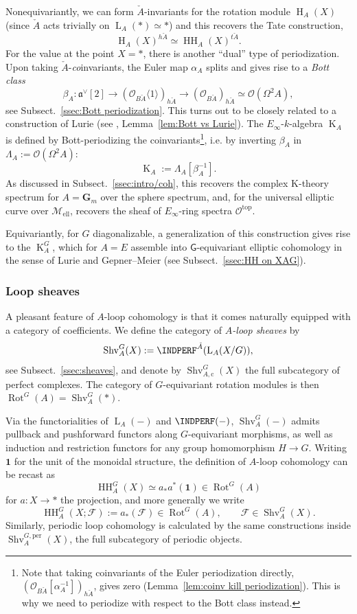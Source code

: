\documentclass[12pt, oneside]{amsart}
\numberwithin{equation}{section}
\theoremstyle{remark}
\theoremstyle{plain}
\newcommand{\frav}{\mathfrak{a}^\vee}
\newcommand{\lam}{\Lambda}
\newcommand{\Loop}{\operatorname{L}}
\newcommand{\OO}{\mathcal{O}}
\newcommand{\GGm}{\mathbf{G}_{m}}
\newcommand{\HH}{\operatorname{HH}}
\newcommand{\Hcoh}{\operatorname{H}}
\newcommand{\K}{\operatorname{K}}
\newcommand{\Thom}[1]{\langle #1 \rangle}
\newcommand{\Mell}{\mathcal{M}_{\mathrm{ell}}}
\newcommand{\Shv}{\operatorname{Shv}}
\newcommand{\Rot}{\operatorname{Rot}}
\newcommand{\un}{\mathbf{1}}
\newcommand{\cF}{\mathcal{F}}
\begin{document}
Nonequivariantly, we can form $\check{A}$-invariants for the rotation module $\Hcoh_A(X)$ (since $\check{A}$ acts trivially on $\Loop_A(*) \simeq *$) and this recovers the Tate construction,
\[ \Hcoh_A(X)^{h\check{A}} \simeq \HH_A(X)^{t\check{A}}. \]
For the value at the point $X=*$, there is another ``dual'' type of periodization.
Upon taking $\check{A}$-\emph{co}invariants, the Euler map $\alpha_A$ splits and gives rise to a \emph{Bott class}
\[ \beta_A : \frav[2] \to (\OO_{B\check{A}}\Thom{1})_{h\check{A}} \to (\OO_{B\check{A}})_{h\check{A}} \simeq \OO(\Omega^2 A), \]
see Subsect.~\ref{ssec:Bott periodization}.
This turns out to be closely related to a construction of Lurie (see \cite[Constr.~4.3.7]{LurieEll2}, Lemma~\ref{lem:Bott vs Lurie}).
The $E_\infty$-$k$-algebra $\K_A$ is defined by Bott-periodizing the coinvariants\footnote{%
  Note that taking coinvariants of the Euler periodization directly, $(\OO_{B\check{A}}[\alpha_A^{-1}])_{h\check{A}}$, gives zero (Lemma~\ref{lem:coinv kill periodization}).
  This is why we need to periodize with respect to the Bott class instead.
}, i.e. by inverting $\beta_A$ in $\lam_A := \OO(\Omega^2 A)$:
\[\K_A := \lam_A[\beta_A^{-1}].\]
As discussed in Subsect.~\ref{ssec:intro/coh}, this recovers the complex K-theory spectrum for $A=\GGm$ over the sphere spectrum, and, for the universal elliptic curve over $\Mell$, recovers the sheaf of $E_\infty$-ring spectra $\OO^{\mathrm{top}}$.

Equivariantly, for $G$ diagonalizable, a generalization of this construction gives rise to the $\K_A^G$, which for $A=E$ assemble into $\mathsf{G}$-equivariant elliptic cohomology in the sense of Lurie and Gepner--Meier (see Subsect.~\ref{ssec:HH on XAG}).

\subsubsection{Loop sheaves}

A pleasant feature of $A$-loop cohomology is that it comes naturally equipped with a category of coefficients.
We define the category of \emph{$A$-loop sheaves} by
\[ \Shv_A^G(X) := \INDPERF^{\check{A}}(\Loop_A(X/G)), \]
see Subsect.~\ref{ssec:sheaves}, and denote by $\Shv_{A,\mathrm{c}}^{G}(X)$ the full subcategory of perfect complexes.
The category of $G$-equivariant rotation modules is then $\Rot^G(A) = \Shv_A^G(*)$.

Via the functorialities of $\Loop_A(-)$ and $\INDPERF(-)$, $\Shv_A^G(-)$ admits pullback and pushforward functors along $G$-equivariant morphisms, as well as induction and restriction functors for any group homomorphism $H \to G$.
Writing $\un$ for the unit of the monoidal structure, the definition of $A$-loop cohomology can be recast as
\[ \HH_A^G(X) \simeq a_* a^*(\un) \in \Rot^G(A) \]
for $a : X \to *$ the projection, and more generally we write
\[ \HH_A^G(X; \cF) := a_* (\cF) \in \Rot^G(A), \qquad \cF \in \Shv_A^G(X). \]
Similarly, periodic loop cohomology is calculated by the same constructions inside $\Shv_A^{G,\mathrm{per}}(X)$, the full subcategory of periodic objects.
\end{document}
